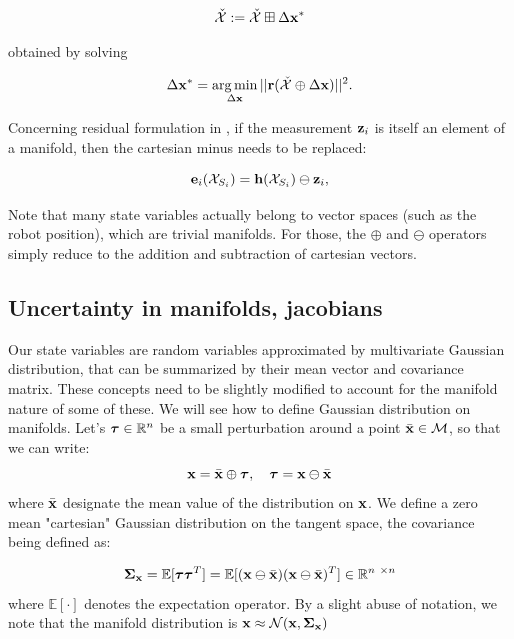\begin{equation}
    \check{\mathcal{X}} := \check{\mathcal{X}} \boxplus \Delta {\bf x}^*
\end{equation}

obtained by solving

\begin{equation}
    \Delta {\bf x}^* = \operatorname*{arg\,min}_{\Delta {\bf x}} ||{\bf r}(\check{\mathcal{X}} \oplus \Delta {\bf x})||^2.
\end{equation}


Concerning residual formulation in , if the measurement ${\bf z}_i$ is itself an element of a manifold, then the cartesian minus needs to be replaced:

\begin{equation}
    {\bf e}_i(\mathcal{X}_{S_i}) = {\bf h}(\mathcal{X}_{S_i}) \ominus {\bf z}_i,
\end{equation}

Note that many state variables actually belong to vector spaces (such as the robot position), which are trivial manifolds. For those, the $\oplus$ and $\ominus$ operators
simply reduce to the addition and subtraction of cartesian vectors.  



\subsection{Uncertainty in manifolds, jacobians}
Our state variables are random variables approximated by multivariate Gaussian distribution, that can be summarized by their mean vector and covariance matrix.
These concepts need to be slightly modified to account for the manifold nature of some of these. We will see how to define Gaussian distribution on manifolds.
Let's ${\bm \tau} \in \mathbb{R}^n$ be a small perturbation around a point $\bar{{\bf x}} \in \mathcal{M}$, so that we can write:
%
\begin{equation}
    {\bf x} = \bar{{\bf x}} \oplus {\bm \tau}, \quad {\bm \tau} = {\bf x} \ominus \bar{{\bf x}}
\end{equation}
%
where $\bar{{\bf x}}$ designate the mean value of the distribution on ${\bf x}$. 
We define a zero mean "cartesian" Gaussian distribution on the tangent space, the covariance being defined as:

\begin{equation}
    \Cov_{\bfx} = \mathbb{E}[\bftau\bftau^T] = \mathbb{E}[(\bfx \ominus \bar{\bfx})(\bfx \ominus \bar{\bfx})^T] \in \Reals^{n \times n}
\end{equation}
where $\mathbb{E}[\cdot]$ denotes the expectation operator.
By a slight abuse of notation, we note that the manifold distribution is ${\bf x} \approx \mathcal{N}({{\bf x}},{{\bm \Sigma}_{{\bf x}}})$

